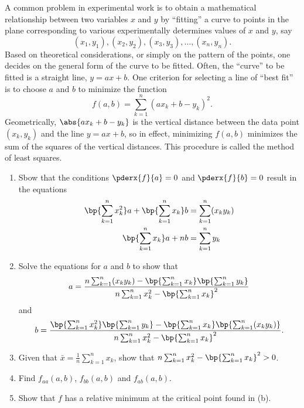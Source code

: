 \begin{problem}
    A common problem in experimental work is to obtain a mathematical relationship between two variables $x$ and $y$ by ``fitting'' a curve to points in the plane corresponding to various experimentally determines values of $x$ and $y$, say \[(x_1, y_1), (x_2, y_2), (x_3, y_3), \ldots, (x_n, y_n).\] Based on theoretical considerations, or simply on the pattern of the points, one decides on the general form of the curve to be fitted. Often, the ``curve'' to be fitted is a straight line, $y = ax + b$. One criterion for selecting a line of ``best fit'' is to choose $a$ and $b$ to minimize the function \[f(a, b) = \sum_{k = 1}^n (ax_k + b - y_k)^2.\] Geometrically, $\abs{ax_k + b - y_k}$ is the vertical distance between the data point $(x_k, y_k)$ and the line $y = ax + b$, so in effect, minimizing $f(a, b)$ minimizes the sum of the squares of the vertical distances. This procedure is called the method of least squares.

    \begin{enumerate}
        \item Sbow that the conditions $\pderx{f}{a} = 0$ and $\pderx{f}{b} = 0$ result in the equations
        \begin{align*}
            \bp{\sum_{k = 1}^n x_k^2} a + \bp{\sum_{k = 1}^n x_k} b &= \sum_{k = 1}^n (x_k y_k)\\
            \bp{\sum_{k = 1}^n x_k} a + nb &= \sum_{k = 1}^n y_k
        \end{align*}
        \item Solve the equations for $a$ and $b$ to show that \[a = \frac{n\sum_{k = 1}^n (x_k y_k) - \bp{\sum_{k = 1}^n x_k}\bp{\sum_{k = 1}^n y_k}}{n\sum_{k = 1}^n x_k^2 - \bp{\sum_{k = 1}^n x_k}^2}\] and \[b = \frac{\bp{\sum_{k = 1}^n x_k^2}\bp{\sum_{k = 1}^n y_k} - \bp{\sum_{k = 1}^n x_k}\bp{\sum_{k = 1}^n (x_k y_k)}}{n\sum_{k = 1}^n x_k^2 - \bp{\sum_{k = 1}^n x_k}^2}.\]
        \item Given that $\bar{x} =  \frac1n \sum_{k = 1}^n x_k$, show that $ n \sum_{k = 1}^n x_k^2 - \bp{\sum_{k = 1}^n x_k}^2 > 0$.
        \item Find $f_{aa}(a, b)$, $f_{bb}(a, b)$ and $f_{ab}(a, b)$.
        \item Show that $f$ has a relative minimum at the critical point found in (b).
    \end{enumerate}
\end{problem}
